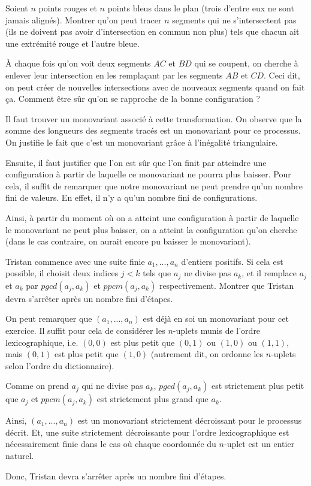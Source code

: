 \begin{exo}
Soient $n$ points rouges et $n$ points bleus dans le plan (trois d'entre eux ne sont jamais alignés). Montrer qu'on peut tracer $n$ segments qui ne s'intersectent pas (ils ne doivent pas avoir d'intersection en commun non plus) tels que chacun ait une extrémité rouge et l'autre bleue.
\end{exo}


\begin{sol}
À chaque fois qu'on voit deux segments $AC$ et $BD$ qui se coupent, on cherche à enlever leur intersection en les remplaçant par les segments $AB$ et $CD$. Ceci dit, on peut créer de nouvelles intersections avec de nouveaux segments quand on fait ça. Comment être sûr qu'on se rapproche de la bonne configuration ?

Il faut trouver un monovariant associé à cette transformation. On observe que la somme des longueurs des segments tracés est un monovariant pour ce processus. On justifie le fait que c'est un monovariant grâce à l'inégalité triangulaire.

Ensuite, il faut justifier que l'on est sûr que l'on finit par atteindre une configuration à partir de laquelle ce monovariant ne pourra plus baisser. Pour cela, il suffit de remarquer que notre monovariant ne peut prendre qu'un nombre fini de valeurs. En effet, il n'y a qu'un nombre fini de configurations.

Ainsi, à partir du moment où on a atteint une configuration à partir de laquelle le monovariant ne peut plus baisser, on a atteint la configuration qu'on cherche (dans le cas contraire, on aurait encore pu baisser le monovariant). 
\end{sol}


\begin{exo}
Tristan commence avec une suite finie $a_1, ..., a_n$ d'entiers positifs. Si cela est possible, il choisit deux indices $j < k$ tels que $a_j$ ne divise pas $a_k$, et il remplace $a_j$ et $a_k$ par $pgcd(a_j, a_k)$ et $ppcm(a_j ,a_k)$ respectivement. Montrer que Tristan devra s'arrêter après un nombre fini d'étapes.
\end{exo}


\begin{sol}
On peut remarquer que $(a_1, ..., a_n)$ est déjà en soi un monovariant pour cet exercice. Il suffit pour cela de considérer les $n$-uplets munis de l'ordre lexicographique, i.e. $(0, 0)$ est plus petit que $(0, 1)$ ou $(1, 0)$ ou $(1, 1)$, mais $(0, 1)$ est plus petit que $(1, 0)$ (autrement dit, on ordonne les $n$-uplets selon l'ordre du dictionnaire).

Comme on prend $a_j$ qui ne divise pas $a_k$, $pgcd(a_j,a_k)$ est strictement plus petit que $a_j$ et $ppcm(a_j,a_k)$ est strictement plus grand que $a_k$.

Ainsi, $(a_1,...,a_n)$ est un monovariant strictement décroissant pour le processus décrit. Et, une suite strictement décroissante pour l'ordre lexicographique est nécessairement finie dans le cas où chaque coordonnée du $n$-uplet est un entier naturel.

Donc, Tristan devra s'arrêter après un nombre fini d'étapes.
\end{sol}


